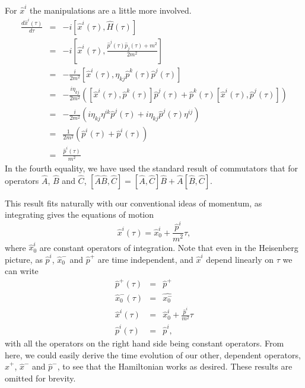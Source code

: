 \documentclass[a4paper,12pt]{article}
\numberwithin{equation}{section}
\begin{document}
For $\hat{x}^i$ the manipulations are a little more involved.
\begin{eqnarray*}
\frac{d\hat{x}^i(\tau)}{d\tau} &=& -i\left[\hat{x}^i(\tau),\hat{H}(\tau)\right]\\ 
&=& -i\left[\hat{x}^i(\tau), \frac{\hat{p}^j(\tau)\hat{p}_j(\tau) + m^2}{2m^2}\right]\\
&=& -\frac{i}{2m^2}\left[\hat{x}^i(\tau),\eta_{k j}\hat{p}^k(\tau)\hat{p}^j(\tau)\right]\\
&=& -\frac{i\eta_{k j}}{2m^2}\left(\left[\hat{x}^i(\tau),\hat{p}^k(\tau)\right]\hat{p}^j(\tau) + \hat{p}^k(\tau)\left[\hat{x}^i(\tau),\hat{p}^j(\tau)\right]\right)\\
&=& -\frac{i}{2m^2}\left(i\eta_{k j}\eta^{i k}\hat{p}^j(\tau) + i\eta_{k j}\hat{p}^j(\tau)\eta^{i j}\right)\\
&=& \frac{1}{2m^2}(\hat{p}^i(\tau) + \hat{p}^i(\tau))\\
&=& \frac{\hat{p}^i(\tau)}{m^2}
\end{eqnarray*}
In the fourth equality, we have used the standard result of commutators that for operators $\hat{A}$, $\hat{B}$ and $\hat{C}$, $[\hat{A}\hat{B},\hat{C}]= [\hat{A},\hat{C}]\hat{B} + \hat{A}[\hat{B},\hat{C}]$.
 
This result fits naturally with our conventional ideas of momentum, as integrating gives the equations of motion
\begin{equation}
\hat{x}^i(\tau) = \hat{x}^i_0 + \frac{\hat{p}^i}{m^2}\tau,
\end{equation}
where $\hat{x}^i_0$ are constant operators of integration. Note that even in the Heisenberg picture, as $\hat{p}^i$, $\hat{x}_0^-$ and $\hat{p}^+$ are time independent, and $\hat{x}^i$ depend linearly on $\tau$ we can write
\begin{eqnarray}
\hat{p}^+(\tau) &=& \hat{p}^+\\
\hat{x}_0^-(\tau) &=& \hat{x_0^-}\\
\hat{x}^i(\tau) &=& \hat{x}_0^i + \frac{\hat{p}^i}{m^2}\tau\\
\hat{p}^i(\tau) &=& \hat{p}^i,
\end{eqnarray}
with all the operators on the right hand side being constant operators.
From here, we could easily derive the time evolution of our other, dependent operators, $\hat{x}^+$, $\hat{x}^-$ and $\hat{p}^-$, to see that the Hamiltonian works as desired. These results are omitted for brevity.
\end{document}
